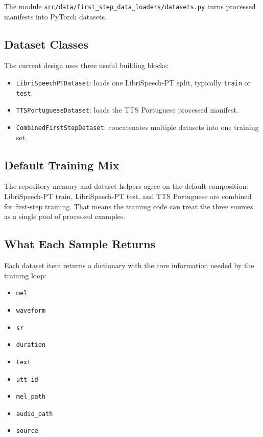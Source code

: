 \documentclass[11pt]{article}
\newcommand{\pathtt}[1]{\texttt{#1}}
\begin{document}
The module \pathtt{src/data/first\_step\_data\_loaders/datasets.py} turns processed manifests into PyTorch datasets.

\subsection{Dataset Classes}

The current design uses three useful building blocks:

\begin{itemize}[leftmargin=1.5em]
  \item \pathtt{LibriSpeechPTDataset}: loads one LibriSpeech-PT split, typically \pathtt{train} or \pathtt{test}.
  \item \pathtt{TTSPortugueseDataset}: loads the TTS Portuguese processed manifest.
  \item \pathtt{CombinedFirstStepDataset}: concatenates multiple datasets into one training set.
\end{itemize}

\subsection{Default Training Mix}

The repository memory and dataset helpers agree on the default composition: LibriSpeech-PT train, LibriSpeech-PT test, and TTS Portuguese are combined for first-step training. That means the training code can treat the three sources as a single pool of processed examples.

\subsection{What Each Sample Returns}

Each dataset item returns a dictionary with the core information needed by the training loop:

\begin{itemize}[leftmargin=1.5em]
  \item \pathtt{mel}
  \item \pathtt{waveform}
  \item \pathtt{sr}
  \item \pathtt{duration}
  \item \pathtt{text}
  \item \pathtt{utt\_id}
  \item \pathtt{mel\_path}
  \item \pathtt{audio\_path}
  \item \pathtt{source}
\end{itemize}
\end{document}
